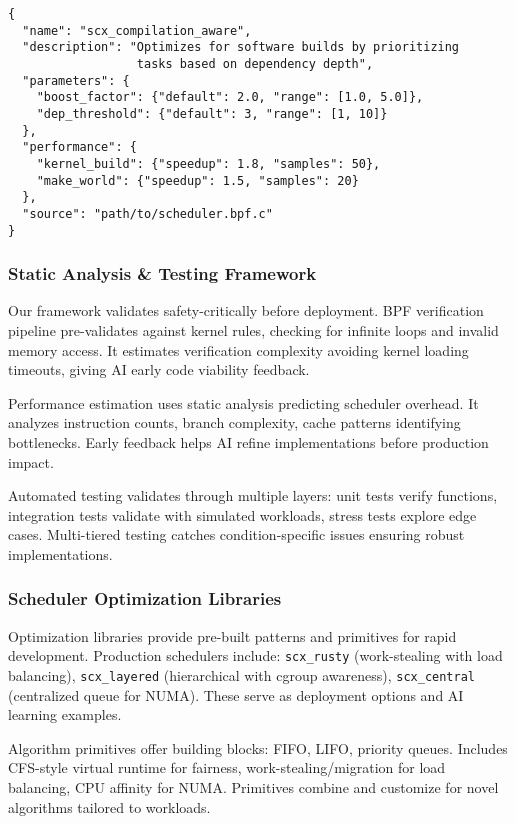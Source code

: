 \begin{verbatim}
{
  "name": "scx_compilation_aware",
  "description": "Optimizes for software builds by prioritizing
                  tasks based on dependency depth",
  "parameters": {
    "boost_factor": {"default": 2.0, "range": [1.0, 5.0]},
    "dep_threshold": {"default": 3, "range": [1, 10]}
  },
  "performance": {
    "kernel_build": {"speedup": 1.8, "samples": 50},
    "make_world": {"speedup": 1.5, "samples": 20}
  },
  "source": "path/to/scheduler.bpf.c"
}
\end{verbatim}

\subsubsection{Static Analysis \& Testing Framework}
Our framework validates safety-critically before deployment. BPF verification pipeline pre-validates against kernel rules, checking for infinite loops and invalid memory access. It estimates verification complexity avoiding kernel loading timeouts, giving AI early code viability feedback.

Performance estimation uses static analysis predicting scheduler overhead. It analyzes instruction counts, branch complexity, cache patterns identifying bottlenecks. Early feedback helps AI refine implementations before production impact.

Automated testing validates through multiple layers: unit tests verify functions, integration tests validate with simulated workloads, stress tests explore edge cases. Multi-tiered testing catches condition-specific issues ensuring robust implementations.

\subsubsection{Scheduler Optimization Libraries}
Optimization libraries provide pre-built patterns and primitives for rapid development. Production schedulers include: \texttt{scx\_rusty} (work-stealing with load balancing), \texttt{scx\_layered} (hierarchical with cgroup awareness), \texttt{scx\_central} (centralized queue for NUMA). These serve as deployment options and AI learning examples.

Algorithm primitives offer building blocks: FIFO, LIFO, priority queues. Includes CFS-style virtual runtime for fairness, work-stealing/migration for load balancing, CPU affinity for NUMA. Primitives combine and customize for novel algorithms tailored to workloads.

